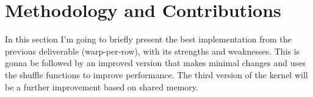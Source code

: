 \documentclass[conference]{IEEEtran}
\begin{document}

\section{Methodology and Contributions}

% 
% 
% 

In this section I'm going to briefly present the best implementation from the previous deliverable (warp-per-row), with its strengths and weaknesses. This is gonna be followed by an improved version that makes minimal changes and uses the shuffle functions to improve performance. The third version of the kernel will be a further improvement based on shared memory.
\end{document}
